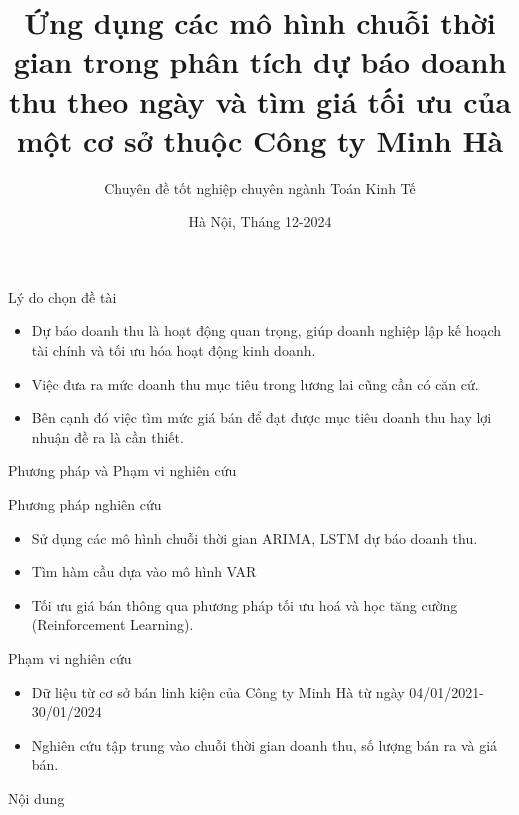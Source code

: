 \documentclass{beamer}
\title[Chuyên đề tốt nghiệp] %
{Ứng dụng các mô hình chuỗi thời gian trong phân tích dự báo doanh thu theo ngày và tìm giá tối ưu của một cơ sở thuộc Công ty Minh Hà}
\author[MFE - NEU] %
{\large Chuyên đề tốt nghiệp chuyên ngành Toán Kinh Tế}
\institute[] %
{ \centering
    \large Sinh viên: Trương Ngọc Thuỳ Trang\\
    \large Mã sinh viên : 11217004 - TOKT63\\
    \large Giảng viên HD:  ThS.Bùi Dương Hải
	

}
\date[12-2024] %
{\small Hà Nội, Tháng 12-2024}
\begin{document}
	
	\frame{\titlepage}
	
	\begin{frame}{Lý do chọn đề tài}
		\begin{itemize}
			\item Dự báo doanh thu là hoạt động quan trọng, giúp doanh nghiệp lập kế hoạch tài chính và tối ưu hóa hoạt động kinh doanh.
			\item Việc đưa ra mức doanh thu mục tiêu trong lương lai cũng cần có căn cứ.
			\item Bên cạnh đó việc tìm mức giá bán để đạt được mục tiêu doanh thu hay lợi nhuận đề ra là cần thiết.
		\end{itemize}
	\end{frame}
	
	\begin{frame}{Phương pháp và Phạm vi nghiên cứu}
		\begin{block}{Phương pháp nghiên cứu}
			\begin{itemize}
				\item Sử dụng các mô hình chuỗi thời gian ARIMA, LSTM dự báo doanh thu.
				\item Tìm hàm cầu dựa vào mô hình VAR
				\item Tối ưu giá bán thông qua phương pháp tối ưu hoá và học tăng cường (Reinforcement Learning).
			\end{itemize}
		\end{block}
		
		\begin{block}{Phạm vi nghiên cứu}
		    \begin{itemize} 
				\item Dữ liệu từ cơ sở bán linh kiện của Công ty Minh Hà từ ngày 04/01/2021-30/01/2024
				\item Nghiên cứu tập trung vào chuỗi thời gian doanh thu, số lượng bán ra và giá bán.
			\end{itemize}
		\end{block}
		
	\end{frame}
	
	\begin{frame}{Nội dung}
		\tableofcontents
	\end{frame}
	
\end{document}

